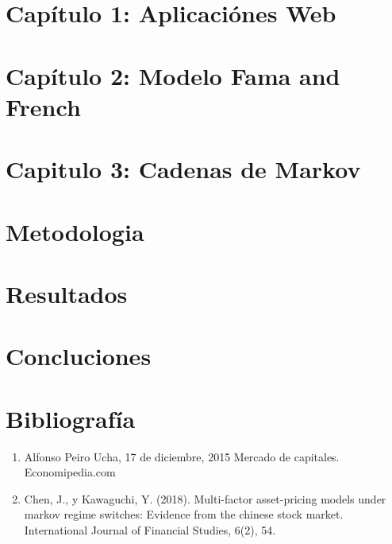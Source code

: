 \documentclass[12pt,a4paper]{article}
\begin{document}
		\section{Capítulo 1: Aplicaciónes Web}
		\section{Capítulo 2: Modelo Fama and French}
		\section{Capitulo 3: Cadenas de Markov}	
		\section{Metodologia}
		\section{Resultados}
		\section{Concluciones}
		\section{Bibliografía}
		\begin{enumerate}
		\item Alfonso Peiro Ucha, 17 de diciembre, 2015 Mercado de capitales. Economipedia.com
		\item Chen, J., y Kawaguchi, Y. (2018). Multi-factor asset-pricing models under markov regime switches: Evidence from the chinese stock market. International Journal of Financial Studies, 6(2), 54.
		\end{enumerate}				
\end{document}
